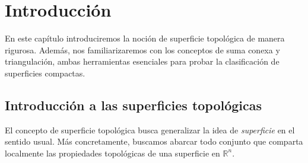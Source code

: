 \documentclass[a4paper,11pt,spanish, twoside, leqno]{tfg-uam}
\theoremstyle{definition}
\begin{document}
\begin{abstract}[english]
This essay contains a mathematical approach to topological surfaces and their classification:

Firstly, basic notions of compact surfaces will be introduced, from which a proof of their classification will be given. As a result we will find that any compact surface is homeomorphic either to: a sphere, or a  finite \textit{connected sum} of torus, or a finite \textit{connected sum} of projective planes.

Afterwards, we will proceed to study the Kerékjártó's theorem, the classification without the hypothesis of compactness. For this, we will require to introduce the concept of ideal boundary, a topological invariant that describes how a surface is divided by its compact subsurfaces. The theorem will guarantee that, with a `genus' and `orientability class', a surface will be topologically determined by its ideal boundary.

Furthermore, we will give a representative for each equivalence class of the classification. A topological result will prove that any ideal boundary is homeomorphic to a subset of the Cantor set. Evenmore, a construction by Ian Richards will prove that given any subset of the Cantor set one can construct a surface that has it as ideal boundary. This construction will allows us to present such representatives. Lastly, we will briefly discuss the numerability of homeomorphic surfaces.
\end{abstract}





\mainmatter
\chapter{Introducción}
En este capítulo introduciremos la noción de superficie topológica de manera rigurosa. Además, nos familiarizaremos con los conceptos de suma conexa y triangulación, ambas herramientas esenciales para probar la clasificación de superficies compactas.
\section{Introducci\'on a las superficies topológicas}
El concepto de superficie topológica busca generalizar la idea de \textit{superficie} en el sentido usual. Más concretamente, buscamos abarcar todo conjunto que comparta localmente las propiedades topológicas de una superficie en $\mathbb{R}^n$. 
\end{document}
